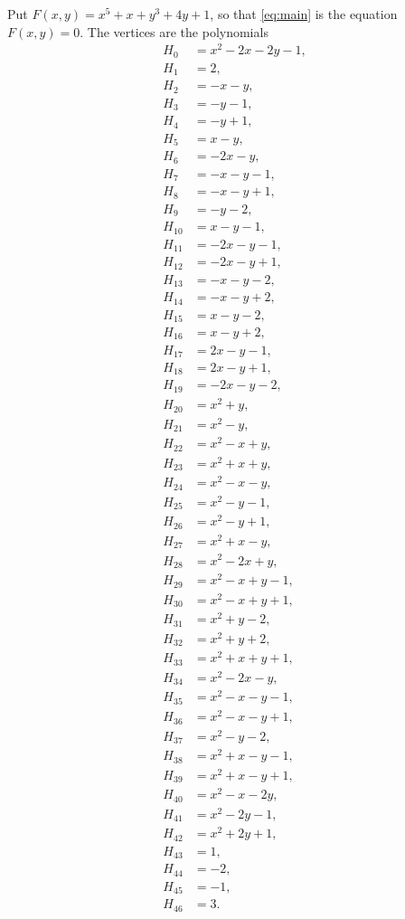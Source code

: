 \documentclass[11pt]{article}
\begin{document}
Put $F(x,y)=x^{5}+x+y^{3}+4y+1$, so that \eqref{eq:main} is the equation $F(x,y)=0$. The vertices are the polynomials
\begin{align*}
H_{0}&=x^{2}-2x-2y-1,\\
H_{1}&=2,\\
H_{2}&=-x-y,\\
H_{3}&=-y-1,\\
H_{4}&=-y+1,\\
H_{5}&=x-y,\\
H_{6}&=-2x-y,\\
H_{7}&=-x-y-1,\\
H_{8}&=-x-y+1,\\
H_{9}&=-y-2,\\
H_{10}&=x-y-1,\\
H_{11}&=-2x-y-1,\\
H_{12}&=-2x-y+1,\\
H_{13}&=-x-y-2,\\
H_{14}&=-x-y+2,\\
H_{15}&=x-y-2,\\
H_{16}&=x-y+2,\\
H_{17}&=2x-y-1,\\
H_{18}&=2x-y+1,\\
H_{19}&=-2x-y-2,\\
H_{20}&=x^{2}+y,\\
H_{21}&=x^{2}-y,\\
H_{22}&=x^{2}-x+y,\\
H_{23}&=x^{2}+x+y,\\
H_{24}&=x^{2}-x-y,\\
H_{25}&=x^{2}-y-1,\\
H_{26}&=x^{2}-y+1,\\
H_{27}&=x^{2}+x-y,\\
H_{28}&=x^{2}-2x+y,\\
H_{29}&=x^{2}-x+y-1,\\
H_{30}&=x^{2}-x+y+1,\\
H_{31}&=x^{2}+y-2,\\
H_{32}&=x^{2}+y+2,\\
H_{33}&=x^{2}+x+y+1,\\
H_{34}&=x^{2}-2x-y,\\
H_{35}&=x^{2}-x-y-1,\\
H_{36}&=x^{2}-x-y+1,\\
H_{37}&=x^{2}-y-2,\\
H_{38}&=x^{2}+x-y-1,\\
H_{39}&=x^{2}+x-y+1,\\
H_{40}&=x^{2}-x-2y,\\
H_{41}&=x^{2}-2y-1,\\
H_{42}&=x^{2}+2y+1,\\
H_{43}&=1,\\
H_{44}&=-2,\\
H_{45}&=-1,\\
H_{46}&=3.
\end{align*}
\end{document}
